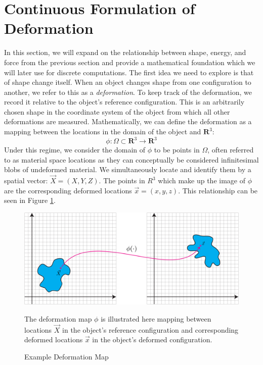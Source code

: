 \section{Continuous Formulation of Deformation}




In this section, we will expand on the relationship between shape,
energy, and force from the previous section and provide a mathematical
foundation which we will later use for discrete computations. The
first idea we need to explore is that of shape change itself. When an
object changes shape from one configuration to another, we refer to
this as a \textit{deformation}. To keep track of the deformation, we
record it relative to the object's reference configuration. This is an arbitrarily
chosen shape in the coordinate system of the object from which all
other deformations are measured. Mathematically, we can define the deformation as
a mapping between the locations in the domain of the object and $\mathbf{R}^3$:
\begin{equation}
  \phi: \Omega \subset \mathbf{R}^3 \rightarrow \mathbf{R}^3
\end{equation}
Under this regime, we consider the domain of $\phi$ to be points in
$\Omega$, often referred to as material space locations as they can
conceptually be considered infinitesimal blobs of undeformed
material. We simultaneously locate and identify them by a spatial
vector: $\vec{X} = (X, Y, Z)$. The points in $R^3$ which make up the
image of $\phi$ are the corresponding deformed locations
$\vec{x} = (x, y, z)$. This relationship can be seen in Figure
\ref{fig:deformationexample}.


\begin{figure}[t]
  \includegraphics[width=\textwidth]{other_images/DeformationFigure.pdf}
  \vspace*{-.3in}
   \caption{Example Deformation Map}{The deformation map $\phi$ is
     illustrated here mapping between locations $\vec{X}$ in the
     object's reference configuration and corresponding deformed
     locations $\vec{x}$ in the object's deformed configuration.}
   \label{fig:deformationexample}
   \vspace*{-.15in}
\end{figure}

